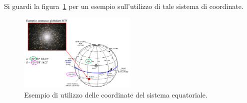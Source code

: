 Si guardi la figura~\ref{fig:esempio-sistema-equatoriale} per un esempio sull'utilizzo di tale sistema di coordinate.

\begin{figure}
\centering
\includegraphics[width=0.5\textwidth]{immagini/esempio-sistema-equatoriale.png}
\caption{Esempio di utilizzo delle coordinate del sistema equatoriale.}
\label{fig:esempio-sistema-equatoriale}
\end{figure}